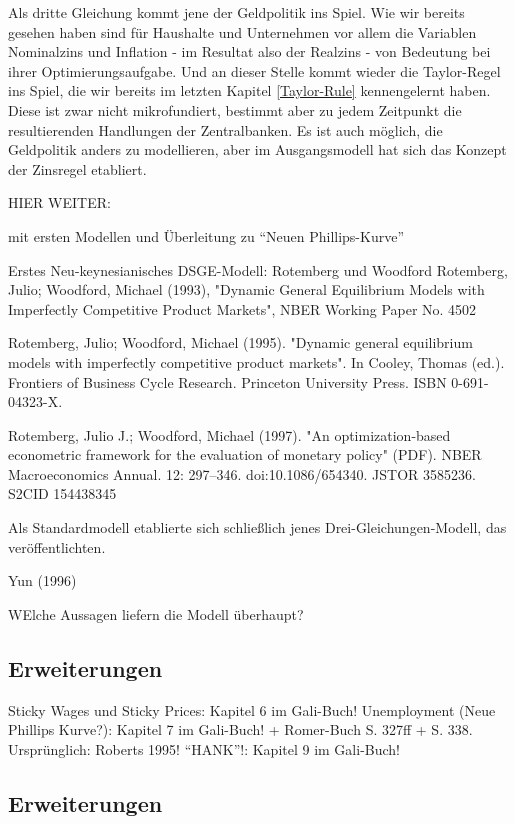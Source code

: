 Als dritte Gleichung kommt jene der Geldpolitik ins Spiel. Wie wir bereits gesehen haben sind für Haushalte und Unternehmen vor allem die Variablen Nominalzins und Inflation - im Resultat also der Realzins -  von Bedeutung bei ihrer Optimierungsaufgabe. Und an dieser Stelle kommt wieder die Taylor-Regel\parencite{Taylor1993} ins Spiel, die wir bereits im letzten Kapitel \ref{Taylor-Rule} kennengelernt haben. Diese ist zwar nicht mikrofundiert, bestimmt aber zu jedem Zeitpunkt die resultierenden Handlungen der Zentralbanken. Es ist auch möglich, die Geldpolitik anders zu modellieren, aber im Ausgangsmodell hat sich das Konzept der Zinsregel etabliert. 


HIER WEITER:

mit ersten Modellen und Überleitung zu "`Neuen Phillips-Kurve"'

Erstes Neu-keynesianisches DSGE-Modell: Rotemberg und Woodford
Rotemberg, Julio; Woodford, Michael (1993), "Dynamic General Equilibrium Models with Imperfectly Competitive Product Markets", NBER Working Paper No. 4502

Rotemberg, Julio; Woodford, Michael (1995). "Dynamic general equilibrium models with imperfectly competitive product markets". In Cooley, Thomas (ed.). Frontiers of Business Cycle Research. Princeton University Press. ISBN 0-691-04323-X.

Rotemberg, Julio J.; Woodford, Michael (1997). "An optimization-based econometric framework for the evaluation of monetary policy" (PDF). NBER Macroeconomics Annual. 12: 297–346. doi:10.1086/654340. JSTOR 3585236. S2CID 154438345


Als Standardmodell etablierte sich schließlich jenes Drei-Gleichungen-Modell, das \textcite{Gali2000} veröffentlichten\parencite[S. 311]{Romer2019}.




Yun (1996)


WElche Aussagen liefern die Modell überhaupt? 





\subsection{Erweiterungen}
Sticky Wages und Sticky Prices: Kapitel 6 im Gali-Buch!
Unemployment (Neue Phillips Kurve?): Kapitel 7 im Gali-Buch! + Romer-Buch S. 327ff + S. 338. Ursprünglich: Roberts 1995!
"`HANK"'!: Kapitel 9 im Gali-Buch!


\subsection{Erweiterungen}


